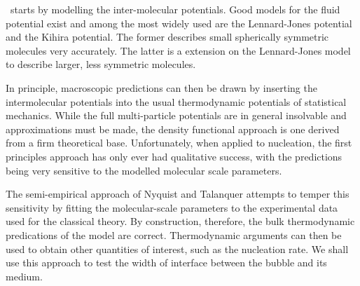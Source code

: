 
 \Dft\ starts by modelling the inter-molecular potentials.
 Good models for the fluid potential exist and 
 among the most widely used are the Lennard-Jones potential
 and the Kihira potential.
 The former describes small spherically symmetric molecules very accurately.
 The latter is a extension on the Lennard-Jones model to describe larger, less symmetric molecules.


In principle, macroscopic predictions can then be drawn by inserting the intermolecular potentials into the usual thermodynamic potentials of statistical mechanics.  
While the full multi-particle potentials are in general insolvable and approximations must be made,
the density functional approach is one derived from a firm theoretical base\cite{Evans1992}.
Unfortunately, when applied to nucleation, the first principles approach  has only ever had qualitative success\cite{Nyquist1995,Talanquer2001},
with the predictions being very sensitive to the modelled molecular scale parameters.

The semi-empirical approach of Nyquist\cite{Nyquist1995} and Talanquer\cite{Talanquer2001}
attempts to temper this sensitivity by fitting the molecular-scale parameters to the experimental data used for the classical theory.
By construction, therefore, the bulk thermodynamic predications of the model are correct.
Thermodynamic arguments can then be used to obtain other quantities of interest, such as the nucleation rate. 
We shall use this approach to test the width of interface between the bubble and its medium.




